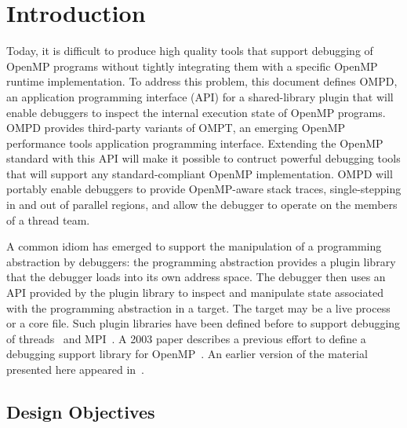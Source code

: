 \section{Introduction}

Today, it is difficult to produce high quality tools that support debugging
of OpenMP programs without tightly integrating them with a specific
OpenMP runtime implementation.
To address this problem, this document defines OMPD, an application
programming interface (API) for a shared-library plugin that will
enable debuggers to inspect the internal execution state of OpenMP programs.
OMPD provides third-party variants of OMPT\cite{ompt-tr2}, an emerging OpenMP
performance tools application programming interface.
Extending the OpenMP standard with this API will make it possible
to contruct powerful debugging tools that will support any
standard-compliant OpenMP implementation.
OMPD will portably enable debuggers to provide OpenMP-aware stack traces,
single-stepping in and out of parallel regions, and allow the debugger
to operate on the members of a thread team.

A common idiom has emerged to support the manipulation of a programming
abstraction by debuggers: the programming abstraction provides
a plugin library that the debugger loads into its own address space.
The debugger then uses an API provided by the plugin library to inspect
and manipulate state associated with the programming abstraction in a target.
The target may be a live process or a core file.
Such plugin libraries have been defined before to support debugging of
threads~\cite{libthreaddb} and MPI~\cite{CownieGropp99}.
A 2003 paper describes a previous effort to define a debugging support
library for OpenMP~\cite{Cownie:2003:DOD:1761900.1761915}.
An earlier version of the material presented here appeared
in~\cite{ompt-ompd:tr}.




\subsection{Design Objectives}

